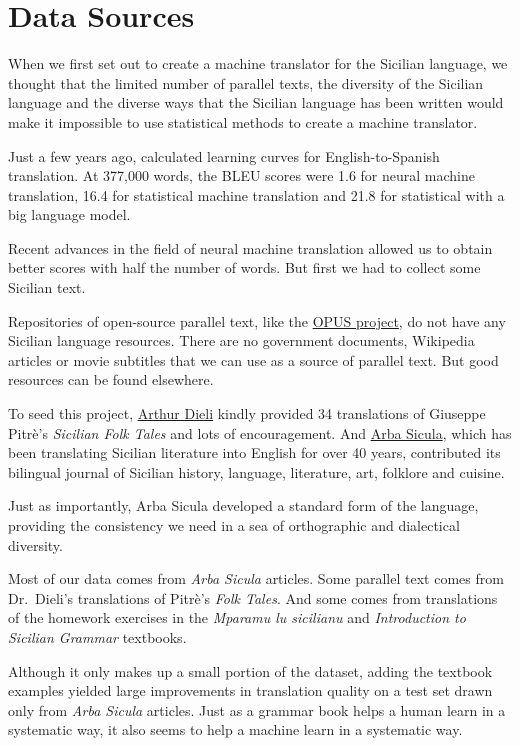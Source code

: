 \documentclass[10pt,letterpaper]{article}
\begin{document}
\hypertarget{data}{}

\section{Data Sources}

When we first set out to create a machine translator for the Sicilian language,
we thought that the limited number of parallel texts, the diversity of the Sicilian
language and the diverse ways that the Sicilian language has been written would make
it impossible to use statistical methods to create a machine translator.

Just a few years ago, \citet{koehnknowles2017} calculated learning curves for
English-to-Spanish translation.  At 377,000 words, the BLEU scores
were 1.6 for neural machine translation, 16.4 for statistical machine
translation and 21.8 for statistical with a big language model.

Recent advances in the field of neural machine translation allowed us to obtain better scores
with half the number of words.  But first we had to collect some Sicilian text.

Repositories of open-source parallel text, like the \href{http://opus.nlpl.eu/}{OPUS project},
do not have any Sicilian language resources.  There are no government documents, Wikipedia articles or
movie subtitles that we can use as a source of parallel text. But good resources can be found elsewhere.

To seed this project, \href{http://www.dieli.net/}{Arthur Dieli} kindly provided
34 translations of Giuseppe Pitrè's \textit{Sicilian Folk Tales} and lots of encouragement.
And \href{http://www.arbasicula.org/}{Arba Sicula}, 
which has been translating Sicilian literature into English for over 40 years,
contributed its bilingual journal of Sicilian history, language, literature,
art, folklore and cuisine.

Just as importantly, Arba Sicula developed a standard form of the language,
providing the consistency we need in a sea of orthographic and dialectical diversity.

Most of our data comes from \textit{Arba Sicula} articles.
Some parallel text comes from Dr.~Dieli's translations of Pitrè's \textit{Folk Tales}.
And some comes from translations of the homework exercises in
the \textit{Mparamu lu sicilianu} \citep{cipolla2013} and 
\textit{Introduction to Sicilian Grammar} \citep{bonner2001} textbooks.

Although it only makes up a small portion of the dataset, adding the textbook examples
yielded large improvements in translation quality on a test set drawn only from
\textit{Arba Sicula} articles.  Just as a grammar book helps a human learn
in a systematic way, it also seems to help a machine learn in a systematic way.
\end{document}
